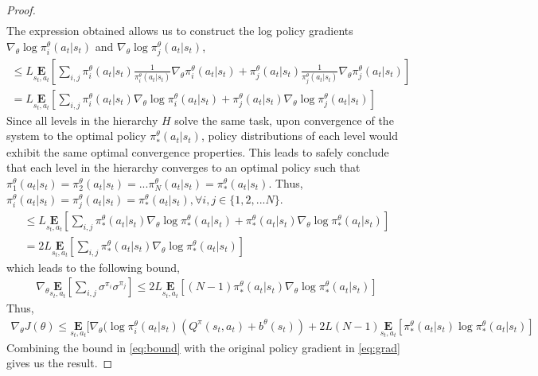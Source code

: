 \documentclass{article}
\begin{document}
\begin{proof}
\begin{gather}
    \end{gather}
    The expression obtained allows us to construct the log policy gradients $\nabla_{\theta}\log\pi^{\theta}_{i}(a_{t}|s_{t})$ and $\nabla_{\theta}\log\pi^{\theta}_{j}(a_{t}|s_{t})$,
    \begin{gather}
        \leq L\underset{s_{t},a_{t}}{\textbf{E}}[\sum_{i,j} \pi^{\theta}_{i}(a_{t}|s_{t})\frac{1}{\pi^{\theta}_{i}(a_{t}|s_{t})}\nabla_{\theta}\pi^{\theta}_{i}(a_{t}|s_{t}) + \pi^{\theta}_{j}(a_{t}|s_{t})\frac{1}{\pi^{\theta}_{j}(a_{t}|s_{t})}\nabla_{\theta}\pi^{\theta}_{j}(a_{t}|s_{t})] \nonumber \\       
        = L\underset{s_{t},a_{t}}{\textbf{E}}[\sum_{i,j} \pi^{\theta}_{i}(a_{t}|s_{t})\nabla_{\theta}\log\pi^{\theta}_{i}(a_{t}|s_{t}) + \pi^{\theta}_{j}(a_{t}|s_{t})\nabla_{\theta}\log\pi^{\theta}_{j}(a_{t}|s_{t})] \nonumber        
    \end{gather}
    Since all levels in the hierarchy $H$ solve the same task, upon convergence of the system to the optimal policy $\pi^{\theta}_{*}(a_{t}|s_{t})$, policy distributions of each level would exhibit the same optimal convergence properties. This leads to safely conclude that each level in the hierarchy converges to an optimal policy such that $\pi^{\theta}_{1}(a_{t}|s_{t}) = \pi^{\theta}_{2}(a_{t}|s_{t}) = ...\pi^{\theta}_{N}(a_{t}|s_{t}) = \pi^{\theta}_{*}(a_{t}|s_{t})$. Thus, $\pi^{\theta}_{i}(a_{t}|s_{t}) = \pi^{\theta}_{j}(a_{t}|s_{t}) = \pi^{\theta}_{*}(a_{t}|s_{t}), \forall i,j \in \{1,2,...N\}$.
    \begin{gather}
        \leq L\underset{s_{t},a_{t}}{\textbf{E}}[\sum_{i,j} \pi^{\theta}_{*}(a_{t}|s_{t})\nabla_{\theta}\log\pi^{\theta}_{*}(a_{t}|s_{t}) + \pi^{\theta}_{*}(a_{t}|s_{t})\nabla_{\theta}\log\pi^{\theta}_{*}(a_{t}|s_{t})] \nonumber \\
        = 2L\underset{s_{t},a_{t}}{\textbf{E}}[\sum_{i,j} \pi^{\theta}_{*}(a_{t}|s_{t})\nabla_{\theta}\log\pi^{\theta}_{*}(a_{t}|s_{t})] \nonumber               
    \end{gather}
    which leads to the following bound,
    \begin{gather}
        \nabla_{\theta}\underset{s_{t},a_{t}}{\textbf{E}}[\sum_{i,j} \sigma^{\pi_{i}}\sigma^{\pi_{j}}] \leq 2L\underset{s_{t},a_{t}}{\textbf{E}}[(N-1) \pi^{\theta}_{*}(a_{t}|s_{t})\nabla_{\theta}\log\pi^{\theta}_{*}(a_{t}|s_{t})] \label{eq:bound}               
    \end{gather}
    Thus,
    \begin{gather}
        \nabla_{\theta}J(\theta) \leq \underset{s_{t},a_{t}}{\textbf{E}}[\nabla_{\theta}(\log \pi^{\theta}_{i}(a_{t}|s_{t})(Q^{\pi}(s_{t},a_{t}) + b^{\theta}(s_{t})) + 2L(N-1)\underset{s_{t},a_{t}}{\textbf{E}}[\pi^{\theta}_{*}(a_{t}|s_{t})\log \pi^{\theta}_{*}(a_{t}|s_{t})] \nonumber
    \end{gather}
    Combining the bound in \autoref{eq:bound} with the original policy gradient in \autoref{eq:grad} gives us the result.
\end{proof}



 

\end{document}
